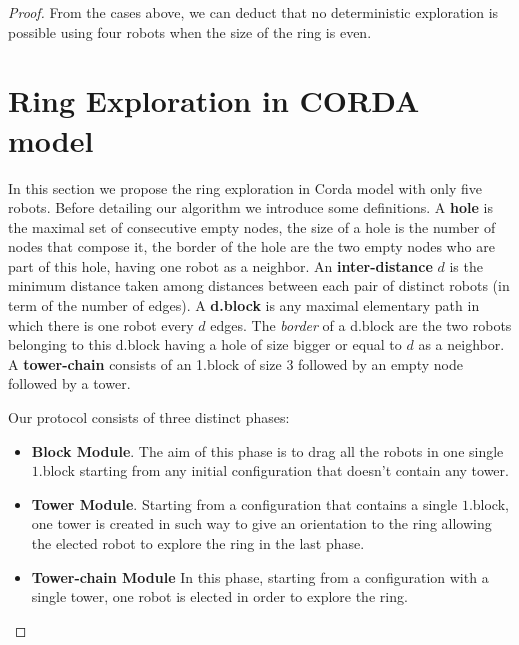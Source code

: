 \documentclass[12pt]{llncs}
\begin{document}
\begin{proof}
From the cases above, we can deduct that no  deterministic exploration is possible using four robots when the size of the ring is even.






\section{Ring Exploration in CORDA model}\label{sec:Exp}
In this section we propose the ring exploration in Corda model with only five robots. Before detailing our algorithm we introduce some definitions. A {\bf hole} is the maximal set of consecutive empty nodes, the size of a hole is the number of nodes that compose it, the border of the hole are the two empty nodes who are part of this hole, having one robot as a neighbor. An {\bf inter-distance} $d$ is the minimum distance taken among distances between each pair of distinct robots (in term of the number of edges). A {\bf d.block} is any maximal elementary path in which there is one robot every $d$ edges. The {\it border} of a d.block are the two robots belonging to this d.block having a hole of size bigger or equal to $d$ as a neighbor. A {\bf tower-chain} consists of an 1.block of size $3$ followed by an empty node followed by a tower.

\label{sec:Overview}
Our protocol consists of three distinct phases:
\begin{itemize}
\item{\textbf{Block Module}. The aim of this phase is to drag all the robots in one single $1$.block starting from any initial configuration that doesn't contain any tower.}

\item{\textbf{Tower Module}. Starting from a configuration that contains a single $1$.block, one tower is created in such way to give an orientation to the ring  allowing the elected robot to explore the ring in the last phase.}

\item{\textbf{Tower-chain Module} In this phase, starting from a configuration with a single tower, one robot is elected in order to explore the ring. 
}
\end{itemize}


\end{proof}
\end{document}
